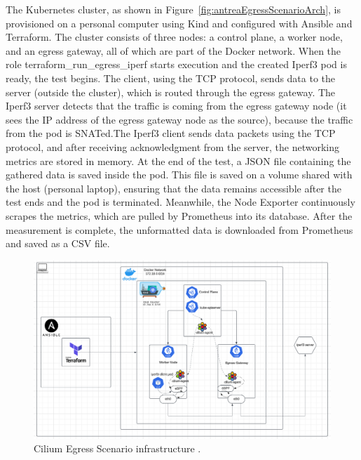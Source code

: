 The Kubernetes cluster, as shown in Figure~\ref{fig:antreaEgressScenarioArch}, is provisioned on a personal computer using Kind and configured with Ansible and Terraform. The cluster consists of three nodes: a control plane, a worker node, and an egress gateway, all of which are part of the Docker network. When the role terraform\_run\_egress\_iperf starts execution and the created Iperf3 pod is ready, the test begins. The client, using the TCP protocol, sends data to the server (outside the cluster), which is routed through the egress gateway. The Iperf3 server detects that the traffic is coming from the egress gateway node (it sees the IP address of the egress gateway node as the source), because the traffic from the pod is SNATed.The Iperf3 client sends data packets using the TCP protocol, and after receiving acknowledgment from the server, the networking metrics are stored in memory. At the end of the test, a JSON file containing the gathered data is saved inside the pod. This file is saved on a volume shared with the host (personal laptop), ensuring that the data remains accessible after the test ends and the pod is terminated. Meanwhile, the Node Exporter continuously scrapes the metrics, which are pulled by Prometheus into its database. After the measurement is complete, the unformatted data is downloaded from Prometheus and saved as a CSV file. 

\begin{figure}[H]
  \centering
  \includegraphics[width=1\columnwidth]{images/cilium_egress_gatateway_cluster.png}
  \caption{Cilium Egress Scenario infrastructure \cite{K8sIcons}\cite{LucidApp}\cite{CiliumEgressGateway}\cite{CiliumComponents}\cite{TerraformIcon}\cite{AnsibleIcon}\cite{KindIcon}\cite{DockerIcon}.}
  \label{fig:ciliumEgressGatewayScenarioArch}
\end{figure}

